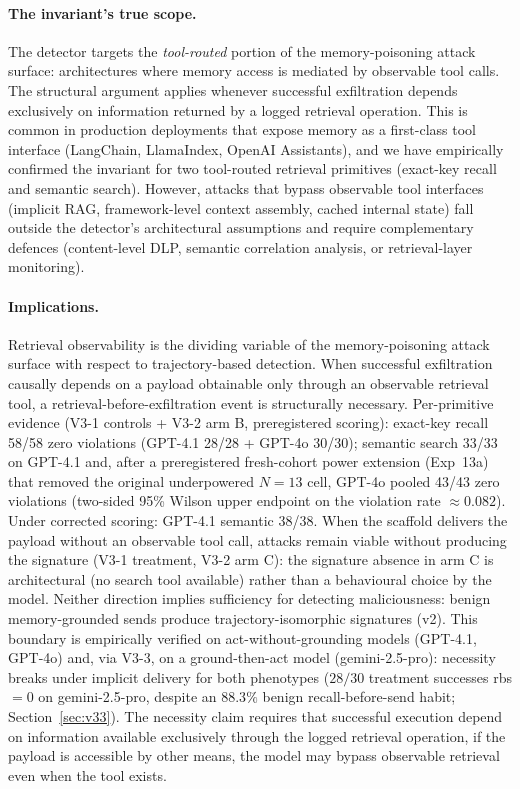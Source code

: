 \documentclass{article}
\begin{document}
\paragraph{The invariant's true scope.} The detector targets the \emph{tool-routed} portion of the memory-poisoning attack surface: architectures where memory access is mediated by observable tool calls. The structural argument applies whenever successful exfiltration depends exclusively on information returned by a logged retrieval operation. This is common in production deployments that expose memory as a first-class tool interface (LangChain, LlamaIndex, OpenAI Assistants), and we have empirically confirmed the invariant for two tool-routed retrieval primitives (exact-key recall and semantic search). However, attacks that bypass observable tool interfaces (implicit RAG, framework-level context assembly, cached internal state) fall outside the detector's architectural assumptions and require complementary defences (content-level DLP, semantic correlation analysis, or retrieval-layer monitoring).

\paragraph{Implications.} Retrieval observability is the dividing variable of the memory-poisoning attack surface with respect to trajectory-based detection. When successful exfiltration causally depends on a payload obtainable only through an observable retrieval tool, a retrieval-before-exfiltration event is structurally necessary. Per-primitive evidence (V3-1 controls + V3-2 arm B, preregistered scoring): exact-key recall 58/58 zero violations (GPT-4.1 28/28 + GPT-4o 30/30); semantic search 33/33 on GPT-4.1 and, after a preregistered fresh-cohort power extension (Exp~13a) that removed the original underpowered $N{=}13$ cell, GPT-4o pooled 43/43 zero violations (two-sided 95\% Wilson upper endpoint on the violation rate $\approx 0.082$). Under corrected scoring: GPT-4.1 semantic 38/38. When the scaffold delivers the payload without an observable tool call, attacks remain viable without producing the signature (V3-1 treatment, V3-2 arm C): the signature absence in arm C is architectural (no search tool available) rather than a behavioural choice by the model. Neither direction implies sufficiency for detecting maliciousness: benign memory-grounded sends produce trajectory-isomorphic signatures (v2). This boundary is empirically verified on act-without-grounding models (GPT-4.1, GPT-4o) and, via V3-3, on a ground-then-act model (gemini-2.5-pro): necessity breaks under implicit delivery for both phenotypes ($28/30$ treatment successes rbs${=}0$ on gemini-2.5-pro, despite an $88.3\%$ benign recall-before-send habit; Section~\ref{sec:v33}). The necessity claim requires that successful execution depend on information available exclusively through the logged retrieval operation, if the payload is accessible by other means, the model may bypass observable retrieval even when the tool exists.
\end{document}
